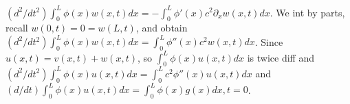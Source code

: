 $(d^2/dt^2) \int_0^L \phi(x) w(x,t)dx = - \int_0^L \phi'(x) c^2 \partial_x w(x,t)dx$. We int by parts, recall $w(0,t)=0=w(L,t)$, and obtain $(d^2/dt^2) \int_0^L\phi(x)w(x,t)dx=\int_0^L\phi''(x)c^2w(x,t)dx$. Since $u(x,t)=v(x,t)+w(x,t)$, so $\int_0^L\phi(x)u(x,t)dx$ is twice diff and $(d^2/dt^2) \int_0^L \phi(x) u(x,t)dx = \int_0^Lc^2\phi''(x)u(x,t)dx$ and $(d/dt)\int_0^L\phi(x)u(x,t)dx=\int_0^L\phi(x)g(x)dx, t=0$. 